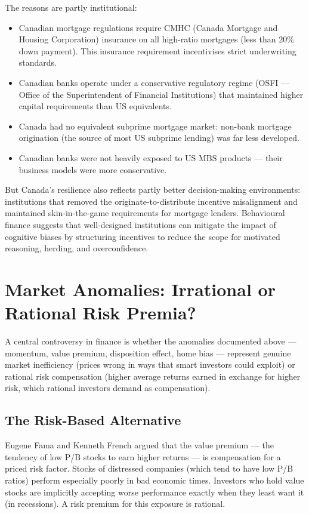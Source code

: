 \documentclass[12pt, letterpaper]{article}
\begin{document}
The reasons are partly institutional:
\begin{itemize}
\item Canadian mortgage regulations require CMHC (Canada Mortgage and Housing Corporation) insurance on all high-ratio mortgages (less than 20\% down payment). This insurance requirement incentivises strict underwriting standards.
\item Canadian banks operate under a conservative regulatory regime (OSFI --- Office of the Superintendent of Financial Institutions) that maintained higher capital requirements than US equivalents.
\item Canada had no equivalent subprime mortgage market: non-bank mortgage origination (the source of most US subprime lending) was far less developed.
\item Canadian banks were not heavily exposed to US MBS products --- their business models were more conservative.
\end{itemize}

But Canada's resilience also reflects partly better decision-making environments: institutions that removed the originate-to-distribute incentive misalignment and maintained skin-in-the-game requirements for mortgage lenders. Behavioural finance suggests that well-designed institutions can mitigate the impact of cognitive biases by structuring incentives to reduce the scope for motivated reasoning, herding, and overconfidence.

\medskip


\section{Market Anomalies: Irrational or Rational Risk Premia?}


A central controversy in finance is whether the anomalies documented above --- momentum, value premium, disposition effect, home bias --- represent genuine market inefficiency (prices wrong in ways that smart investors could exploit) or rational risk compensation (higher average returns earned in exchange for higher risk, which rational investors demand as compensation).


\subsection{The Risk-Based Alternative}


Eugene Fama and Kenneth French argued that the value premium --- the tendency of low P/B stocks to earn higher returns --- is compensation for a priced risk factor. Stocks of distressed companies (which tend to have low P/B ratios) perform especially poorly in bad economic times. Investors who hold value stocks are implicitly accepting worse performance exactly when they least want it (in recessions). A risk premium for this exposure is rational.
\end{document}
